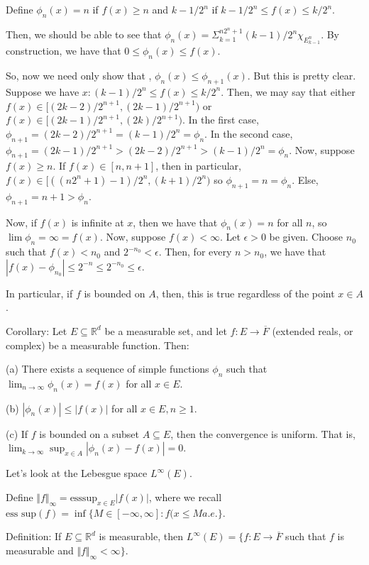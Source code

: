 \documentclass[10pt]{article}
\begin{document}
Define $\phi_n(x) = n$ if $f(x) \geq n$ and $k-1/2^n$ if $k-1/2^n \leq f(x) \leq k/ 2^n$. 

Then, we should be able to see that $\phi_n(x) = \Sigma_{k=1}^{n2^n + 1} (k-1)/2^n \chi_{E^n_{k-1}}$. By construction, we have that $0 \leq \phi_n(x) \leq f(x)$.

So, now we need only show that , $\phi_n(x) \leq \phi_{n+1}(x)$. But this is pretty clear. Suppose we have $x : (k-1)/2^n \leq f(x) \leq k/ 2^n$. Then, we may say that either $ f(x) \in [(2k-2)/2^{n+1},(2k-1)/2^{n+1}) $ or $ f(x) \in [(2k-1)/2^{n+1},(2k)/2^{n+1}) $. In the first case, $\phi_{n+1} = (2k-2)/2^{n+1} = (k-1)/2^n = \phi_n$. In the second case, $\phi_{n+1} = (2k-1)/2^{n+1} > (2k-2)/2^{n+1} > (k-1)/2^n  = \phi_n$. Now, suppose $ f(x) \geq n$. If $f(x) \in [n,n+1]$, then in particular, $f(x) \in [((n2^n + 1) - 1)/2^n, (k+1)/2^n)$ so $\phi_{n+1} = n = \phi_n$. Else, $\phi_{n+1} = n + 1 > \phi_n$.

Now, if $f(x)$ is infinite at $x$, then we have that $\phi_n(x) = n$ for all $n$, so $\lim \phi_n = \infty  = f(x)$. Now, suppose $f(x) < \infty$. Let $\epsilon > 0$ be given. Choose $n_0$ such that $f(x) < n_0$ and $2^{-n_0} < \epsilon$. Then, for every $n > n_0$, we have that $|f(x) - \phi_{n_0}  | \leq 2^{-n} \leq 2^{-n_0} \leq \epsilon$.

In particular, if $f$ is bounded on $A$, then, this is true regardless of the point $x \in A$.

Corollary: Let $E \subseteq \mathbb{R}^d$ be a measurable set, and let $f: E \to \overline{F}$  (extended reals, or complex) be a measurable function. Then:

(a) There exists a sequence of simple functions $\phi_n$ such that $\lim_{n\to \infty} \phi_n(x) = f(x)$ for all $x \in E$.

(b) $|\phi_n(x)| \leq |f(x)|$ for all $x \in E, n \geq 1$.

(c) If $f$ is bounded on a subset $A \subseteq E$, then the convergence is uniform. That is, $\lim_{k\to \infty} \sup_{x \in A} | \phi_n(x) - f(x) | = 0$.

Let’s look at the Lebesgue space $L^\infty(E)$.

Define $\Vert f \Vert_\infty = \text{esssup}_{x \in E} |f(x)|$, where we recall $\text{ess sup}(f) =\inf \{ M \in [-\infty,\infty] : f(x \leq M a.e.\}$.

Definition: If $E \subseteq \mathbb{R}^d$ is measurable, then $L^\infty(E) = \{ f: E \to \overline{F}$ such that $f$ is measurable and $\Vert f \Vert_\infty < \infty \}$.
\end{document}
